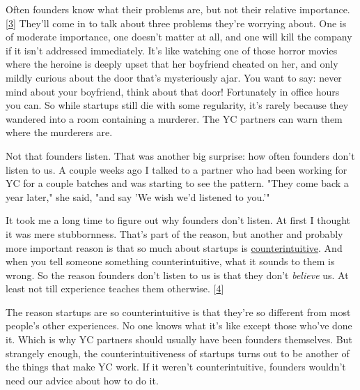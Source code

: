 Often founders know what their problems are,
                  but not their relative importance.
                  [\href{\#f3n}{3}]
                  They'll come in to talk about three problems they're worrying
                  about. One is of moderate importance, one doesn't matter at
                  all, and one will kill the company if it isn't addressed
                  immediately. It's like watching one of those horror movies
                  where the heroine is deeply upset that her boyfriend cheated
                  on her, and only mildly curious about the door that's
                  mysteriously ajar. You want to say: never mind about your
                  boyfriend, think about that door! Fortunately in office hours
                  you can. So while startups still die with some regularity,
                  it's rarely because they wandered into a room containing a
                  murderer. The YC partners can warn them where the murderers
                  are.

Not that founders listen. That was another big
                  surprise: how often founders don't listen to us. A couple
                  weeks ago I talked to a partner who had been working for YC
                  for a couple batches and was starting to see the pattern.
                  "They come back a year later," she said, "and say 'We wish
                  we'd listened to you.'"

It took me a long time to
                  figure out why founders don't listen. At first I thought it
                  was mere stubbornness. That's part of the reason, but another
                  and probably more important reason is that so much about
                  startups is \href{http://www.paulgraham.com/before.html}{counterintuitive}. And
                  when you tell someone something counterintuitive, what it
                  sounds to them is wrong. So the reason founders don't listen
                  to us is that they don't \emph{believe} us. At least not till
                  experience teaches them otherwise.
                  [\href{\#f4n}{4}]

The reason startups are so counterintuitive is
                  that they're so different from most people's other
                  experiences. No one knows what it's like except those who've
                  done it. Which is why YC partners should usually have been
                  founders themselves. But strangely enough, the
                  counterintuitiveness of startups turns out to be another of
                  the things that make YC work. If it weren't counterintuitive,
                  founders wouldn't need our advice about how to do it.

